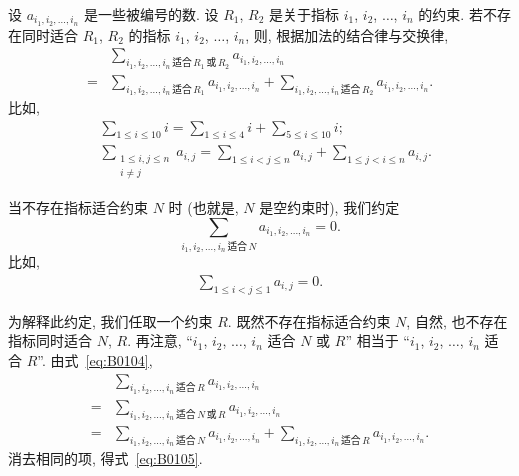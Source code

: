 \documentclass[../libro.tex]{subfiles}
\begin{document}
设 \(a_{i_1, i_2, \dots, i_n}\) 是一些被编号的数.
设 \(R_1\), \(R_2\)
是关于指标 \(i_1\), \(i_2\), \(\dots\), \(i_n\) 的约束.
若不存在同时适合 \(R_1\), \(R_2\)
的指标 \(i_1\), \(i_2\), \(\dots\), \(i_n\),
则, 根据加法的结合律与交换律,
\begin{equation}
    \begin{aligned}
        &
        \sum_{i_1,i_2,\dots,i_n
        \,\text{适合}\,R_1\,\text{或}\,R_2}
        {a_{i_1, i_2, \dots, i_n}}
        \\
        = {} &
        \sum_{i_1,i_2,\dots,i_n\,\text{适合}\,R_1}
        {a_{i_1, i_2, \dots, i_n}}
        + \sum_{i_1,i_2,\dots,i_n\,\text{适合}\,R_2}
        {a_{i_1, i_2, \dots, i_n}}.
    \end{aligned}
    \label{eq:B0104}
\end{equation}
比如,
\begin{align*}
    &
    \sum_{1 \leq i \leq 10} {i}
    = \sum_{1 \leq i \leq 4} {i}
    + \sum_{5 \leq i \leq 10} {i};
    \\
    &
    \sum_{\substack{1 \leq i, j \leq n \\ i \neq j}} {a_{i,j}}
    = \sum_{1 \leq i < j \leq n} {a_{i,j}}
    + \sum_{1 \leq j < i \leq n} {a_{i,j}}.
\end{align*}

当不存在指标适合约束 \(N\) 时
(也就是, \(N\) 是空约束时),
我们约定
\begin{equation}
    \sum_{i_1,i_2,\dots,i_n\,\text{适合}\,N}
    {a_{i_1, i_2, \dots, i_n}} = 0.
    \label{eq:B0105}
\end{equation}
比如,
\begin{align*}
    \sum_{1 \leq i < j \leq 1} {a_{i,j}} = 0.
\end{align*}

为解释此约定, 我们任取一个约束 \(R\).
既然不存在指标适合约束 \(N\),
自然, 也不存在指标同时适合 \(N\), \(R\).
再注意,
``\(i_1\), \(i_2\), \(\dots\), \(i_n\)
适合 \(N\) 或 \(R\)''
相当于
``\(i_1\), \(i_2\), \(\dots\), \(i_n\)
适合 \(R\)''.
由式~\eqref{eq:B0104},
\begin{align*}
    &
    \sum_{i_1,i_2,\dots,i_n\,\text{适合}\,R}
    {a_{i_1, i_2, \dots, i_n}}
    \\
    = {} &
    \sum_{i_1,i_2,\dots,i_n\,\text{适合}\,N\,\text{或}\,R}
    {a_{i_1, i_2, \dots, i_n}}
    \\
    = {} &
    \sum_{i_1,i_2,\dots,i_n\,\text{适合}\,N}
    {a_{i_1, i_2, \dots, i_n}}
    + \sum_{i_1,i_2,\dots,i_n\,\text{适合}\,R}
    {a_{i_1, i_2, \dots, i_n}}.
\end{align*}
消去相同的项, 得式~\eqref{eq:B0105}.
\end{document}
